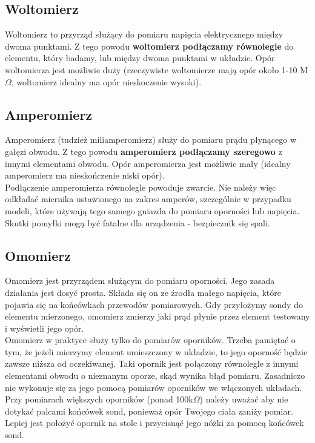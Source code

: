 \documentclass{pdfBooklets}
\begin{document}
\subsection{Woltomierz}
Woltomierz to przyrząd służący do pomiaru napięcia elektrycznego między dwoma punktami. Z tego powodu
\textbf{woltomierz podłączamy równolegle} do elementu, który badamy, lub między dwoma punktami w układzie. Opór woltomierza jest możliwie duży (rzeczywiste
woltomierze mają opór około 1-10 M$\Omega$, woltomierz idealny ma opór nieskoczenie wysoki).

\subsection{Amperomierz}
Amperomierz (tudzież miliamperomierz) służy do pomiaru prądu płynącego w gałęzi obwodu. Z tego powodu
\textbf{amperomierz podłączamy szeregowo} z innymi elementami obwodu. Opór amperomierza jest możliwie mały (idealny amperomierz
ma nieskończenie niski opór).
\\

Podłączenie amperomierza równolegle powoduje zwarcie. Nie należy więc odkładać miernika ustawionego na zakres amperów, szczególnie
w przypadku modeli, które używają tego samego gniazda do pomiaru oporności lub napięcia. Skutki pomyłki mogą być fatalne dla
urządzenia - bezpiecznik się spali.

\subsection{Omomierz}
Omomierz jest przyrządem służącym do pomiaru oporności. Jego zasada działania jest dosyć prosta. Składa się on ze źrodła małego napięcia, które pojawia się na końcówkach przewodów pomiarowych. Gdy przyłożymy sondy do elementu mierzonego, omomierz zmierzy jaki prąd płynie przez element testowany i wyświetli jego opór.
\\

Omomierz w praktyce służy tylko do pomiarów oporników. Trzeba pamiętać o tym, że jeżeli mierzymy element umieszczony w układzie,
to jego oporność będzie zawsze niższa od oczekiwanej. Taki opornik jest połączony równolegle z innymi elementami obwodu o
nieznanym oporze, skąd wynika błąd pomiaru.
Zasadniczo nie wykonuje się za jego pomocą pomiarów oporników we włączonych układach.
\\

Przy pomiarach większych oporników (ponad 100k$\Omega$) należy uważać aby nie dotykać palcami końcówek sond, ponieważ opór Twojego ciała
zaniży pomiar. Lepiej jest położyć opornik na stole i przycisnąć jego nóżki za pomocą końcówek sond.
\end{document}
